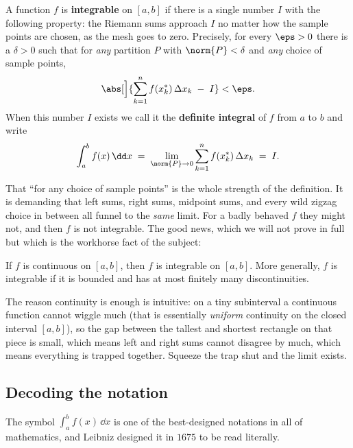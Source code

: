 \begin{definition}
\label{ch20:def-definite-integral}
A function $f$ is \textbf{integrable} on $[a,b]$ if there is a single number $I$
with the following property: the Riemann sums approach $I$ no matter how the
sample points are chosen, as the mesh goes to zero. Precisely, for every
$\eps > 0$ there is a $\delta > 0$ such that for \emph{any} partition $P$ with
$\norm{P} < \delta$ and \emph{any} choice of sample points,
\[
  \abs[\Big]{\sum_{k=1}^{n} f(x_k^\ast)\,\Delta x_k \;-\; I} < \eps.
\]
When this number $I$ exists we call it the \textbf{definite integral} of $f$
from $a$ to $b$ and write
\[
  \int_a^b f(x)\,\dd x \;=\; \lim_{\norm{P}\to 0}
      \sum_{k=1}^{n} f(x_k^\ast)\,\Delta x_k \;=\; I.
\]
\end{definition}

That ``for any choice of sample points'' is the whole strength of the
definition. It is demanding that left sums, right sums, midpoint sums, and every
wild zigzag choice in between all funnel to the \emph{same} limit. For a badly
behaved $f$ they might not, and then $f$ is not integrable. The good news, which
we will not prove in full but which is the workhorse fact of the subject:

\begin{theorem}
\label{ch20:thm-cont-integrable}
If $f$ is continuous on $[a,b]$, then $f$ is integrable on $[a,b]$. More
generally, $f$ is integrable if it is bounded and has at most finitely many
discontinuities.
\end{theorem}

The reason continuity is enough is intuitive: on a tiny subinterval a continuous
function cannot wiggle much (that is essentially \emph{uniform} continuity on the
closed interval $[a,b]$), so the gap between the tallest and shortest rectangle
on that piece is small, which means left and right sums cannot disagree by much,
which means everything is trapped together. Squeeze the trap shut and the limit
exists.

\subsection{Decoding the notation}

The symbol $\int_a^b f(x)\,\dd x$ is one of the best-designed notations in all of
mathematics, and Leibniz designed it in $1675$ to be read literally.

